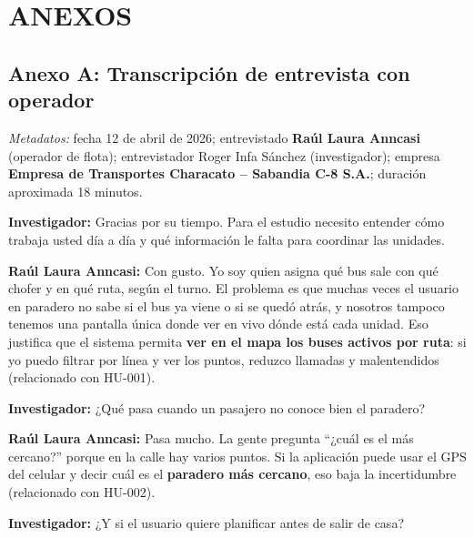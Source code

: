 
\section*{ANEXOS}

\subsection*{Anexo A: Transcripción de entrevista con operador}

\textit{Metadatos:} fecha 12 de abril de 2026; entrevistado \textbf{Raúl Laura Anncasi} (operador de flota); entrevistador Roger Infa Sánchez (investigador); empresa \textbf{Empresa de Transportes Characato -- Sabandia C-8 S.A.}; duración aproximada 18 minutos.

\vspace{0.5em}
\noindent\textbf{Investigador:} Gracias por su tiempo. Para el estudio necesito entender cómo trabaja usted día a día y qué información le falta para coordinar las unidades.

\vspace{0.35em}
\noindent\textbf{Raúl Laura Anncasi:} Con gusto. Yo soy quien asigna qué bus sale con qué chofer y en qué ruta, según el turno. El problema es que muchas veces el usuario en paradero no sabe si el bus ya viene o si se quedó atrás, y nosotros tampoco tenemos una pantalla única donde ver en vivo dónde está cada unidad. Eso justifica que el sistema permita \textbf{ver en el mapa los buses activos por ruta}: si yo puedo filtrar por línea y ver los puntos, reduzco llamadas y malentendidos (relacionado con HU-001).

\vspace{0.35em}
\noindent\textbf{Investigador:} ¿Qué pasa cuando un pasajero no conoce bien el paradero?

\vspace{0.35em}
\noindent\textbf{Raúl Laura Anncasi:} Pasa mucho. La gente pregunta ``¿cuál es el más cercano?'' porque en la calle hay varios puntos. Si la aplicación puede usar el GPS del celular y decir cuál es el \textbf{paradero más cercano}, eso baja la incertidumbre (relacionado con HU-002).

\vspace{0.35em}
\noindent\textbf{Investigador:} ¿Y si el usuario quiere planificar antes de salir de casa?

